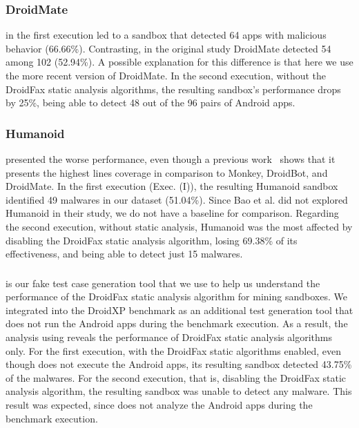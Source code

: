 \subsubsection*{DroidMate} in the first execution led to a sandbox that detected 64 apps with malicious behavior (66.66\%). Contrasting, in the original study DroidMate detected 54 among 102 (52.94\%). A possible explanation for this difference is that here we use the more recent version of DroidMate. In the second execution, without the DroidFax static analysis algorithms, the resulting sandbox's performance drops by 25\%, being able to detect 48 out of the 96 pairs of Android apps. 


\subsubsection*{Humanoid} presented the worse performance, even though a previous
work~\cite{DBLP:conf/kbse/LiY0C19} shows that it presents the highest lines coverage in comparison to Monkey, DroidBot, and DroidMate. In the first execution (Exec. (I)), the resulting Humanoid sandbox identified 49 malwares in our dataset (51.04\%). Since Bao et al. did not explored Humanoid in their study, we do not have a baseline for comparison. Regarding the second execution, without static analysis, Humanoid was the most affected by disabling the DroidFax static analysis algorithm, losing 69.38\% of its effectiveness, and being able to detect just 15 malwares.

\subsubsection*{\joke} is our fake test case generation tool that we use to help us understand the performance of the DroidFax static analysis algorithm for mining sandboxes. We integrated \joke into the DroidXP benchmark as an additional test generation tool that does not run the Android apps during the benchmark execution. As a result, the analysis using \joke reveals the performance of DroidFax static analysis algorithms only. For the first execution, with the DroidFax static algorithms enabled, even though \joke does not execute the Android apps, its resulting sandbox detected 43.75\% of the malwares. For the second execution, that is, disabling the DroidFax static analysis algorithm, the resulting \joke sandbox was unable to detect any malware. This result was expected, since \joke does not analyze the Android apps during the benchmark execution.

